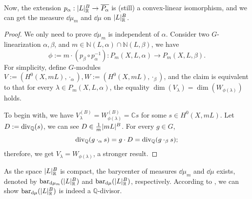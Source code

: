 Now, the extension $p_\alpha: \mathopen{}\left|L\right|\mathclose{}_\mathbb{R}^B \to \overline{P_\alpha}$ is (still) a convex-linear isomorphism, and we can get the measure $\dd \mu_m$ and $\dd \mu$ on $\mathopen{}\left|L\right|\mathclose{}_\mathbb{R}^B$.

\begin{proof}
	We only need to prove $\dd \mu_m$ is independent of $\alpha$. Consider two $G$-linearization $\alpha, \beta$, and $m \in \mathbb{N}(L, \alpha) \cap \mathbb{N}(L, \beta)$, we have
	\begin{equation*}
		\phi := m \cdot (p_\beta \circ p_\alpha^{-1}) : P_m(X, L, \alpha) \to P_m(X, L, \beta).
	\end{equation*}
	For simplicity, define $G$-modules $V := (H^0(X, m L), \cdot_\alpha), W := (H^0(X, m L), \cdot_\beta)$, and the claim is equivalent to that for every $\lambda \in P_m(X, L, \alpha)$, the equality $\dim(V_\lambda) = \dim(W_{\phi(\lambda)})$ holds.
	
	To begin with, we have $V_\lambda^{(B)} = W_{\phi(\lambda)}^{(B)} = \mathbb{C} s$ for some $s \in H^0(X, m L)$. Let $D := \mathrm{div}_\mathbb{Q}(s)$, we can see $D \in {1 \over m} \ls{m L}^B$. For every $g \in G$,
	\begin{equation*}
		\mathrm{div}_\mathbb{Q}(g \cdot_\alpha s) = g \cdot D = \mathrm{div}_\mathbb{Q}(g \cdot_\beta s);
	\end{equation*}
	therefore, we get $V_\lambda = W_{\phi(\lambda)}$, a stronger result.
\end{proof}


As the space $\mathopen{}\left|L\right|\mathclose{}_\mathbb{R}^B$ is compact, the barycenter of measures $\dd \mu_m$ and $\dd \mu$ exists, denoted by $\mathrm{bar}_{\mathrm{d} \mu_m}(\mathopen{}\left|L\right|\mathclose{}_\mathbb{R}^B)$ and $\mathrm{bar}_{\mathrm{d} \mu}(\mathopen{}\left|L\right|\mathclose{}_\mathbb{R}^B)$, respectively. According to \cite[\S4.1]{Brion_grp_Pic_num_char_sph}, we can show $\mathrm{bar}_{\mathrm{d} \mu}(\mathopen{}\left|L\right|\mathclose{}_\mathbb{R}^B)$ is indeed a $\mathbb{Q}$-divisor.

